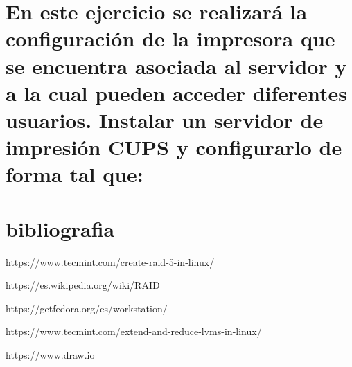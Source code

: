 \documentclass[preprint,11pt]{elsarticle}
\begin{document}
\section{En este ejercicio se realizará la configuración de la impresora que se encuentra asociada al servidor y a la cual pueden acceder diferentes usuarios. Instalar un servidor de impresión CUPS y configurarlo de forma tal que:
}



\clearpage

\clearpage
\section{bibliografia}
https://www.tecmint.com/create-raid-5-in-linux/ \smallskip

https://es.wikipedia.org/wiki/RAID\smallskip

https://getfedora.org/es/workstation/\smallskip

https://www.tecmint.com/extend-and-reduce-lvms-in-linux/\smallskip

https://www.draw.io\smallskip
\end{document}
